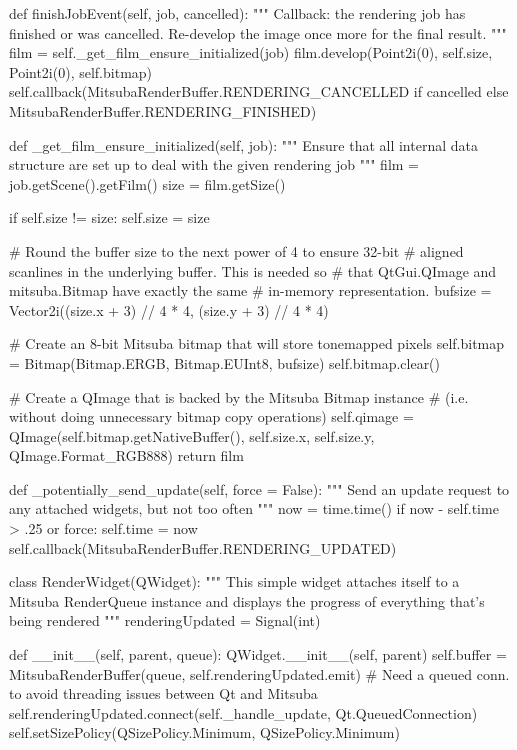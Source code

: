 \begin{python}
    def finishJobEvent(self, job, cancelled):
        """ Callback: the rendering job has finished or was cancelled.
            Re-develop the image once more for the final result. """
        film = self._get_film_ensure_initialized(job)
        film.develop(Point2i(0), self.size, Point2i(0), self.bitmap)
        self.callback(MitsubaRenderBuffer.RENDERING_CANCELLED if cancelled
                      else MitsubaRenderBuffer.RENDERING_FINISHED)

    def _get_film_ensure_initialized(self, job):
        """ Ensure that all internal data structure are set up to deal
            with the given rendering job """
        film = job.getScene().getFilm()
        size = film.getSize()

        if self.size != size:
            self.size = size

            # Round the buffer size to the next power of 4 to ensure 32-bit
            # aligned scanlines in the underlying buffer. This is needed so
            # that QtGui.QImage and mitsuba.Bitmap have exactly the same
            # in-memory representation.
            bufsize = Vector2i((size.x + 3) // 4 * 4, (size.y + 3) // 4 * 4)

            # Create an 8-bit Mitsuba bitmap that will store tonemapped pixels
            self.bitmap = Bitmap(Bitmap.ERGB, Bitmap.EUInt8, bufsize)
            self.bitmap.clear()

            # Create a QImage that is backed by the Mitsuba Bitmap instance
            # (i.e. without doing unnecessary bitmap copy operations)
            self.qimage = QImage(self.bitmap.getNativeBuffer(), self.size.x,
                                 self.size.y, QImage.Format_RGB888)
        return film

    def _potentially_send_update(self, force = False):
        """ Send an update request to any attached widgets, but not too often """
        now = time.time()
        if now - self.time > .25 or force:
            self.time = now
            self.callback(MitsubaRenderBuffer.RENDERING_UPDATED)

class RenderWidget(QWidget):
    """ This simple widget attaches itself to a Mitsuba RenderQueue instance
        and displays the progress of everything that's being rendered """
    renderingUpdated = Signal(int)

    def __init__(self, parent, queue):
        QWidget.__init__(self, parent)
        self.buffer = MitsubaRenderBuffer(queue, self.renderingUpdated.emit)
        # Need a queued conn. to avoid threading issues between Qt and Mitsuba
        self.renderingUpdated.connect(self._handle_update, Qt.QueuedConnection)
        self.setSizePolicy(QSizePolicy.Minimum, QSizePolicy.Minimum)


\end{python}
